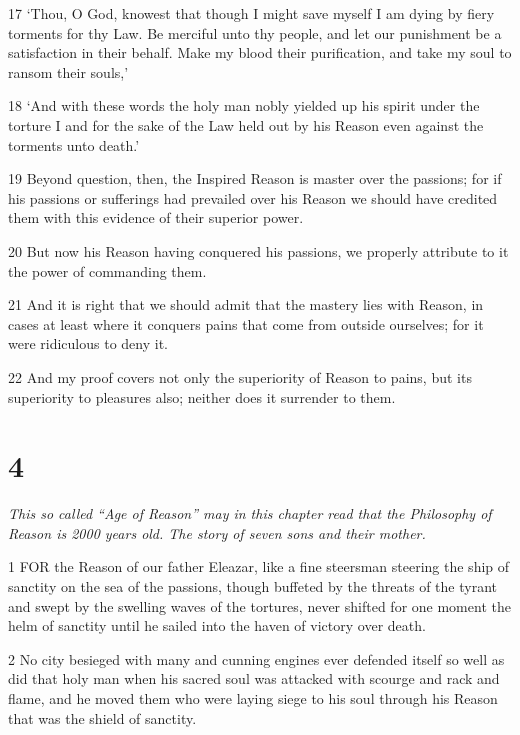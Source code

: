 \par 17 ‘Thou, O God, knowest that though I might save myself I am dying by fiery torments for thy Law. Be merciful unto thy people, and let our punishment be a satisfaction in their behalf. Make my blood their purification, and take my soul to ransom their souls,’

\par 18 ‘And with these words the holy man nobly yielded up his spirit under the torture I and for the sake of the Law held out by his Reason even against the torments unto death.’

\par 19 Beyond question, then, the Inspired Reason is master over the passions; for if his passions or sufferings had prevailed over his Reason we should have credited them with this evidence of their superior power.

\par 20 But now his Reason having conquered his passions, we properly attribute to it the power of commanding them.

\par 21 And it is right that we should admit that the mastery lies with Reason, in cases at least where it conquers pains that come from outside ourselves; for it were ridiculous to deny it.

\par 22 And my proof covers not only the superiority of Reason to pains, but its superiority to pleasures also; neither does it surrender to them.

\chapter{4}

\par \textit{This so called “Age of Reason” may in this chapter read that the Philosophy of Reason is 2000 years old. The story of seven sons and their mother.}

\par 1 FOR the Reason of our father Eleazar, like a fine steersman steering the ship of sanctity on the sea of the passions, though buffeted by the threats of the tyrant and swept by the swelling waves of the tortures, never shifted for one moment the helm of sanctity until he sailed into the haven of victory over death.

\par 2 No city besieged with many and cunning engines ever defended itself so well as did that holy man when his sacred soul was attacked with scourge and rack and flame, and he moved them who were laying siege to his soul through his Reason that was the shield of sanctity.

